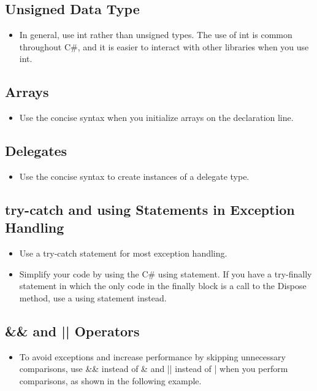 \documentclass[11pt]{article}
\begin{document}
\subsection{Unsigned Data Type}
\begin{itemize}
	\item In general, use int rather than unsigned types. The use of int is common throughout C\#, and it is easier to interact with other libraries when you use int.
\end{itemize}
\subsection{Arrays}
\begin{itemize}
	\item Use the concise syntax when you initialize arrays on the declaration line.
\end{itemize}

\subsection{Delegates} %
\label{sub:delegates}
\begin{itemize}
	\item Use the concise syntax to create instances of a delegate type.
\end{itemize}


\subsection{try-catch and using Statements in Exception Handling} %
\label{sub:try_catch_and_using_statements_in_exception_handling}
\begin{itemize}
	\item Use a try-catch statement for most exception handling.
\end{itemize}

\begin{itemize}
	\item Simplify your code by using the C\# using statement. If you have a try-finally statement in which the only code in the finally block is a call to the Dispose method, use a using statement instead.
\end{itemize}

\subsection{\&\& and || Operators} %
\begin{itemize}
	\item To avoid exceptions and increase performance by skipping unnecessary comparisons, use \&\& instead of \& and || instead of | when you perform comparisons, as shown in the following example.
\end{itemize}

\end{document}
